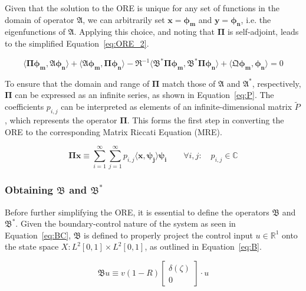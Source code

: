 Given that the solution to the ORE is unique for any set of functions in the domain of operator $\mathfrak{A}$, we can arbitrarily set $\bm{x} = \bm{\phi_m}$ and $\bm{y} = \bm{\phi_n}$, i.e. the eigenfunctions of $\mathfrak{A}$. Applying this choice, and noting that $\mathbf{\Pi}$ is self-adjoint, leads to the simplified Equation~\ref{eq:ORE_2}.

\begin{equation} \label{eq:ORE_2}
    \langle \mathbf{\Pi} \bm{\phi_m}, \mathfrak{A} \bm{\phi_n} \rangle
    + \langle \mathfrak{A} \bm{\phi_m}, \mathbf{\Pi} \bm{\phi_n} \rangle
    - \mathfrak{R}^{-1} \langle \mathfrak{B}^* \mathbf{\Pi} \bm{\phi_m}, \mathfrak{B}^* \mathbf{\Pi} \bm{\phi_n} \rangle 
    + \langle \mathfrak{Q} \bm{\phi_m}, \bm{\phi_n} \rangle = 0
\end{equation}

To ensure that the domain and range of $\mathbf{\Pi}$ match those of $\mathfrak{A}$ and $\mathfrak{A}^*$, respectively, $\mathbf{\Pi}$ can be expressed as an infinite series, as shown in Equation~\ref{eq:P}. The coefficients $p_{i,j}$ can be interpreted as elements of an infinite-dimensional matrix $\tilde{P}$, which represents the operator $\mathbf{\Pi}$. This forms the first step in converting the ORE to the corresponding Matrix Riccati Equation (MRE).

\begin{equation} \label{eq:P}
    \mathbf{\Pi} \bm{x} \equiv \sum_{i=1}^{\infty}\sum_{j=1}^{\infty} p_{i,j} \langle \bm{x}, \bm{\psi_j} \rangle \bm{\psi_i} \qquad
    \forall {i,j}: \quad p_{i,j} \in \mathbb{C}
\end{equation}

\subsubsection{Obtaining $\mathfrak{B}$ and $\mathfrak{B}^*$}

Before further simplifying the ORE, it is essential to define the operators $\mathfrak{B}$ and $\mathfrak{B}^*$. Given the boundary-control nature of the system as seen in Equation~\ref{eq:BC}, $\mathfrak{B}$ is defined to properly project the control input $u \in \mathbb{R}^1$ onto the state space $X: L^2[0,1] \times L^2[0,1]$, as outlined in Equation~\ref{eq:B}.

\begin{equation} \label{eq:B}
    \mathfrak{B} u \equiv v(1-R)
    \begin{bmatrix}
        \delta(\zeta) \\ 0
    \end{bmatrix} \cdot u
\end{equation}

